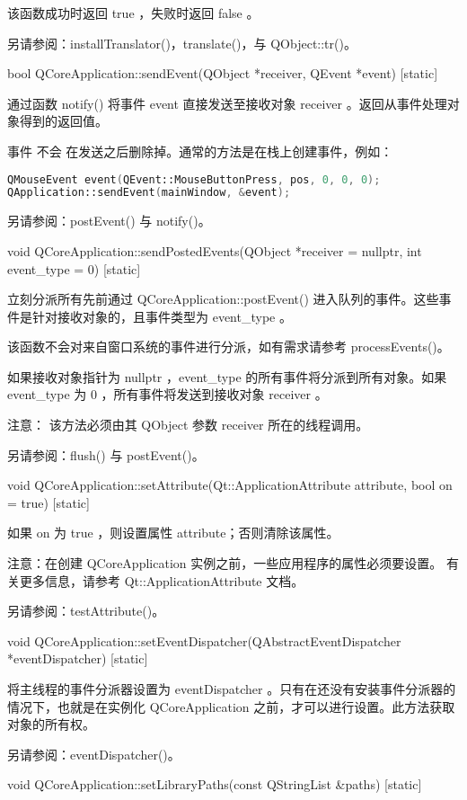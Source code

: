 该函数成功时返回 true ，失败时返回 false 。

另请参阅：installTranslator()，translate()，与 QObject::tr()。

bool QCoreApplication::sendEvent(QObject *receiver, QEvent *event) [static]

通过函数 notify() 将事件 event 直接发送至接收对象 receiver 。返回从事件处理对象得到的返回值。

事件 不会 在发送之后删除掉。通常的方法是在栈上创建事件，例如：

\begin{lstlisting}[language=C++]
QMouseEvent event(QEvent::MouseButtonPress, pos, 0, 0, 0);
QApplication::sendEvent(mainWindow, &event);
\end{lstlisting}

另请参阅：postEvent() 与 notify()。

void QCoreApplication::sendPostedEvents(QObject *receiver = nullptr, int event\_type = 0) [static]

立刻分派所有先前通过 QCoreApplication::postEvent() 进入队列的事件。这些事件是针对接收对象的，且事件类型为 event\_type 。

该函数不会对来自窗口系统的事件进行分派，如有需求请参考 processEvents()。

如果接收对象指针为 nullptr ，event\_type 的所有事件将分派到所有对象。如果 event\_type 为 0 ，所有事件将发送到接收对象 receiver 。

注意： 该方法必须由其 QObject 参数 receiver 所在的线程调用。

另请参阅：flush() 与 postEvent()。

void QCoreApplication::setAttribute(Qt::ApplicationAttribute attribute, bool on = true) [static]

如果 on 为 true ，则设置属性 attribute；否则清除该属性。

注意：在创建 QCoreApplication 实例之前，一些应用程序的属性必须要设置。 有关更多信息，请参考 Qt::ApplicationAttribute 文档。

另请参阅：testAttribute()。

void QCoreApplication::setEventDispatcher(QAbstractEventDispatcher *eventDispatcher) [static]

将主线程的事件分派器设置为 eventDispatcher 。只有在还没有安装事件分派器的情况下，也就是在实例化 QCoreApplication 之前，才可以进行设置。此方法获取对象的所有权。

另请参阅：eventDispatcher()。

void QCoreApplication::setLibraryPaths(const QStringList \&paths) [static]

